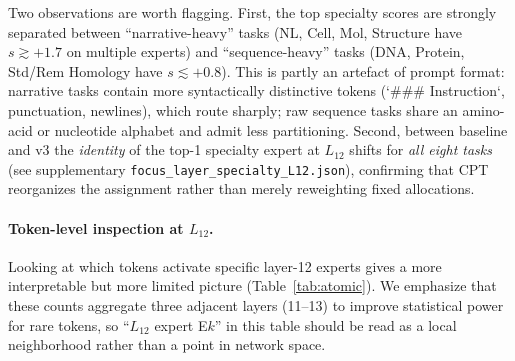 \documentclass[11pt]{article}
\begin{document}
Two observations are worth flagging. First, the top specialty scores are strongly separated between ``narrative-heavy'' tasks (NL, Cell, Mol, Structure have $s \gtrsim +1.7$ on multiple experts) and ``sequence-heavy'' tasks (DNA, Protein, Std/Rem Homology have $s \lesssim +0.8$). This is partly an artefact of prompt format: narrative tasks contain more syntactically distinctive tokens (`\#\#\# Instruction`, punctuation, newlines), which route sharply; raw sequence tasks share an amino-acid or nucleotide alphabet and admit less partitioning. Second, between baseline and v3 the \emph{identity} of the top-1 specialty expert at $L_{12}$ shifts for \emph{all eight tasks} (see supplementary \texttt{focus\_layer\_specialty\_L12.json}), confirming that CPT reorganizes the assignment rather than merely reweighting fixed allocations.

\paragraph{Token-level inspection at $L_{12}$.}
\label{sec:moe-tokens}
Looking at which tokens activate specific layer-12 experts gives a more interpretable but more limited picture (Table~\ref{tab:atomic}). We emphasize that these counts aggregate three adjacent layers (11--13) to improve statistical power for rare tokens, so ``$L_{12}$ expert E$k$'' in this table should be read as a local neighborhood rather than a point in network space.
\end{document}
